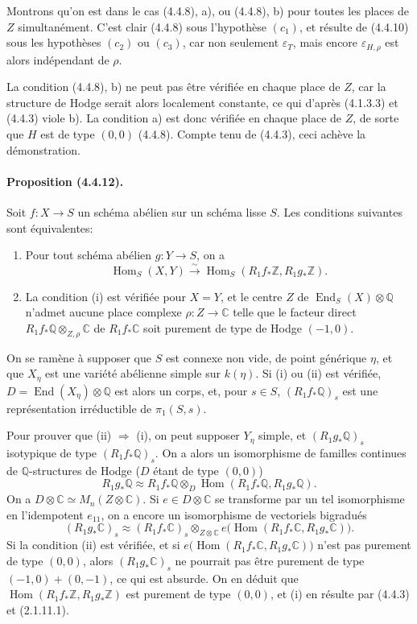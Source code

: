 \documentclass[10pt]{article}
\newcommand{\C}{\mathbb C}
\newcommand{\Q}{\mathbb Q}
\newcommand{\Z}{\mathbb Z}
\newcommand{\Hom}{\operatorname{Hom}}
\newcommand{\iso}{\xrightarrow{\sim}}
\providecommand{\End}{\operatorname{End}}
\begin{document}
Montrons qu'on est dans le cas (4.4.8), a), ou (4.4.8), b) pour toutes les places de $Z$ simultanément. C'est clair (4.4.8) sous l'hypothèse $(c_1)$, et résulte de (4.4.10) sous les hypothèses $(c_2)$ ou $(c_3)$, car non seulement $\varepsilon_T$, mais encore $\varepsilon_{H,\rho}$ est alors indépendant de $\rho$.

La condition (4.4.8), b) ne peut pas être vérifiée en chaque place de $Z$, car la structure de Hodge serait alors localement constante, ce qui d'après (4.1.3.3) et (4.4.3) viole b). La condition a) est donc vérifiée en chaque place de $Z$, de sorte que $H$ est de type $(0,0)$ (4.4.8). Compte tenu de (4.4.3), ceci achève la démonstration.

\paragraph{Proposition (4.4.12).} Soit $f:X\to S$ un schéma abélien sur un schéma lisse $S$. Les conditions suivantes sont équivalentes:
\begin{enumerate}[label=(\roman*)]
\item Pour tout schéma abélien $g:Y\to S$, on a
\[
\Hom_S(X,Y)\iso \Hom_S(R_1f_*\Z,R_1g_*\Z).
\]
\item La condition (i) est vérifiée pour $X=Y$, et le centre $Z$ de $\End_S(X)\otimes\Q$ n'admet aucune place complexe $\rho:Z\to\C$ telle que le facteur direct $R_1f_*\Q\otimes_{Z,\rho}\C$ de $R_1f_*\C$ soit purement de type de Hodge $(-1,0)$.
\end{enumerate}




On se ramène à supposer que $S$ est connexe non vide, de point générique $\eta$, et que $X_\eta$ est une variété abélienne simple sur $k(\eta)$. Si (i) ou (ii) est vérifiée, $D=\End(X_\eta)\otimes\Q$ est alors un corps, et, pour $s\in S$, $(R_1f_*\Q)_s$ est une représentation irréductible de $\pi_1(S,s)$.

Pour prouver que (ii) $\Rightarrow$ (i), on peut supposer $Y_\eta$ simple, et $(R_1g_*\Q)_s$ isotypique de type $(R_1f_*\Q)_s$. On a alors un isomorphisme de familles continues de $\Q$-structures de Hodge ($D$ étant de type $(0,0)$)
\[
R_1g_*\Q\approx R_1f_*\Q\otimes_D
\Hom(R_1f_*\Q,R_1g_*\Q).
\]
On a $D\otimes\C\simeq M_n(Z\otimes\C)$. Si $e\in D\otimes\C$ se transforme par un tel isomorphisme en l'idempotent $e_{11}$, on a encore un isomorphisme de vectoriels bigradués
\[
(R_1g_*\C)_s\approx (R_1f_*\C)_s\otimes_{Z\otimes\C}
e\bigl(\Hom(R_1f_*\C,R_1g_*\C)\bigr).
\]
Si la condition (ii) est vérifiée, et si $e\bigl(\Hom(R_1f_*\C,R_1g_*\C)\bigr)$ n'est pas purement de type $(0,0)$, alors $(R_1g_*\C)_s$ ne pourrait pas être purement de type $(-1,0)+(0,-1)$, ce qui est absurde. On en déduit que $\Hom(R_1f_*\Z,R_1g_*\Z)$ est purement de type $(0,0)$, et (i) en résulte par (4.4.3) et (2.1.11.1).
\end{document}
